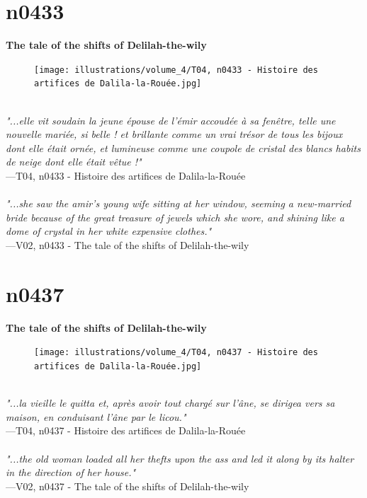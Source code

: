 \documentclass[../Carre_nights.tex]{subfiles}
\begin{document}
\newpage

\section{n0433}
\textbf{\Large{The tale of the shifts of Delilah-the-wily}} \\

\begin{figure}[ht]
\centering
\texttt{[image: illustrations/volume\_4/T04, n0433 - Histoire des artifices de Dalila-la-Rouée.jpg]}
\end{figure}

\textit{\\
"...elle vit soudain la jeune épouse de l’émir accoudée à sa fenêtre, telle une nouvelle mariée, si belle ! et brillante comme un vrai trésor de tous les bijoux dont elle était ornée, et lumineuse comme une coupole de cristal des blancs habits de neige dont elle était vêtue !"} \\
—T04, n0433 - Histoire des artifices de Dalila-la-Rouée \\~\\
\textit{"...she saw the amir's young wife sitting at her window, seeming a new-married bride because of the great treasure of jewels which she wore, and shining like a dome of crystal in her white expensive clothes."} \\
—V02, n0433 - The tale of the shifts of Delilah-the-wily

\newpage

\section{n0437}
\textbf{\Large{The tale of the shifts of Delilah-the-wily}} \\

\begin{figure}[ht]
\centering
\texttt{[image: illustrations/volume\_4/T04, n0437 - Histoire des artifices de Dalila-la-Rouée.jpg]}
\end{figure}

\textit{\\
"...la vieille le quitta et, après avoir tout chargé sur l’âne, se dirigea vers sa maison, en conduisant l’âne par le licou."} \\
—T04, n0437 - Histoire des artifices de Dalila-la-Rouée \\~\\
\textit{"...the old woman loaded all her thefts upon the ass and led it along by its halter in the direction of her house."} \\
—V02, n0437 - The tale of the shifts of Delilah-the-wily
\end{document}
